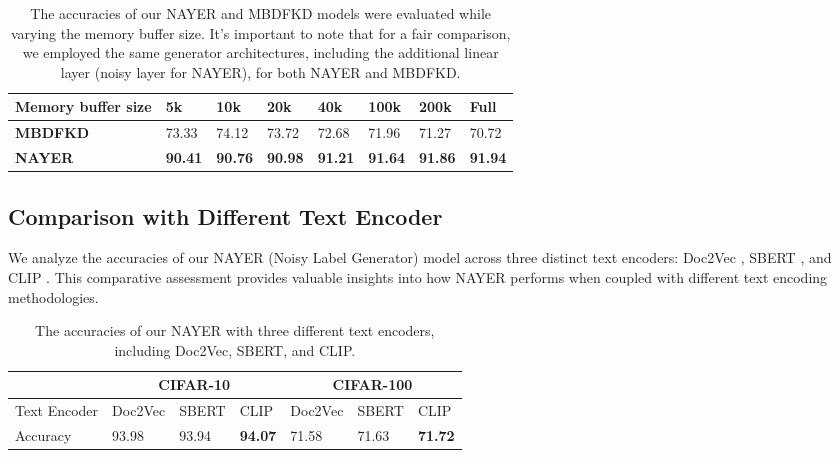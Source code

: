 \documentclass{article} %
\begin{document}
\begin{table}[h]
\centering
\caption{The accuracies of our NAYER and MBDFKD models were evaluated while varying the memory buffer size. It's important to note that for a fair comparison, we employed the same generator architectures, including the additional linear layer (noisy layer for NAYER), for both NAYER and MBDFKD.}
\begin{adjustbox}{width=0.8\linewidth}
\begin{tabular}{@{}llllllll@{}}
\toprule
\textbf{Memory buffer size} & 5k    & 10k   & 20k   & 40k   & 100k  & 200k  & Full  \\ \midrule
\textbf{MBDFKD }           & 73.33 & 74.12 & 73.72 & 72.68 & 71.96 & 71.27 & 70.72 \\
\textbf{NAYER}                & \textbf{90.41} & \textbf{90.76} & \textbf{90.98} & \textbf{91.21} & \textbf{91.64} & \textbf{91.86} & \textbf{91.94} \\ \bottomrule
\end{tabular}
\end{adjustbox}
\label{tab:as_mulmem}
\end{table}

\subsection{Comparison with Different Text Encoder}
We analyze the accuracies of our NAYER (Noisy Label Generator) model across three distinct text encoders: Doc2Vec \citep{doc2vec}, SBERT \citep{sbert}, and CLIP \citep{clip}. This comparative assessment provides valuable insights into how NAYER performs when coupled with different text encoding methodologies.

\begin{table}[h]
\centering
\caption{The accuracies of our NAYER with three different text encoders, including Doc2Vec, SBERT, and CLIP.}
\begin{adjustbox}{width=0.8\linewidth}
\begin{tabular}{@{}lllllll@{}}
\toprule
             & \multicolumn{3}{c}{CIFAR-10} & \multicolumn{3}{c}{CIFAR-100} \\ \midrule
Text Encoder & Doc2Vec    & SBERT    & CLIP   & Doc2Vec   & SBERT   & CLIP    \\
Accuracy           & 93.98     & 93.94   & \textbf{94.07}  & 71.58     & 71.63   & \textbf{71.72}   \\ \bottomrule
\end{tabular}
\end{adjustbox}
\label{tab:as_multe}
\end{table}
\end{document}
